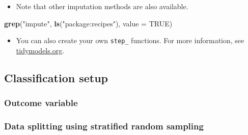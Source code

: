 \documentclass[
]{book}
\newenvironment{Shaded}{\begin{snugshade}}{\end{snugshade}}
\newcommand{\AttributeTok}[1]{\textcolor[rgb]{0.13,0.29,0.53}{#1}}
\newcommand{\ConstantTok}[1]{\textcolor[rgb]{0.56,0.35,0.01}{#1}}
\newcommand{\FunctionTok}[1]{\textcolor[rgb]{0.13,0.29,0.53}{\textbf{#1}}}
\newcommand{\NormalTok}[1]{#1}
\newcommand{\OtherTok}[1]{\textcolor[rgb]{0.56,0.35,0.01}{#1}}
\newcommand{\SpecialCharTok}[1]{\textcolor[rgb]{0.81,0.36,0.00}{\textbf{#1}}}
\newcommand{\StringTok}[1]{\textcolor[rgb]{0.31,0.60,0.02}{#1}}
\providecommand{\tightlist}{%
  \setlength{\itemsep}{0pt}\setlength{\parskip}{0pt}}
\begin{document}
\begin{itemize}
\tightlist
\item
  Note that other imputation methods are also available.
\end{itemize}

\begin{Shaded}
\begin{Highlighting}[]
\FunctionTok{grep}\NormalTok{(}\StringTok{"impute"}\NormalTok{, }\FunctionTok{ls}\NormalTok{(}\StringTok{"package:recipes"}\NormalTok{), }\AttributeTok{value =} \ConstantTok{TRUE}\NormalTok{)}
\end{Highlighting}
\end{Shaded}

\begin{itemize}
\tightlist
\item
  You can also create your own \texttt{step\_} functions. For more information, see \href{https://www.tidymodels.org/learn/develop/recipes/}{tidymodels.org}.
\end{itemize}

\subsection{Classification setup}\label{classification-setup}

\subsubsection{Outcome variable}\label{outcome-variable-1}

\begin{Shaded}
\end{Shaded}

\subsubsection{Data splitting using stratified random sampling}\label{data-splitting-using-stratified-random-sampling}
\end{document}
